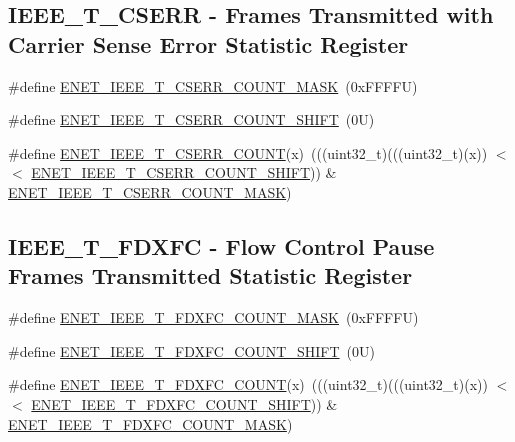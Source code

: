 \subsection*{I\+E\+E\+E\+\_\+\+T\+\_\+\+C\+S\+E\+RR -\/ Frames Transmitted with Carrier Sense Error Statistic Register}
\begin{DoxyCompactItemize}
\item 
\#define \mbox{\hyperlink{group___e_n_e_t___register___masks_gaa0672cfe66f04b84789c73a1eeb66ade}{E\+N\+E\+T\+\_\+\+I\+E\+E\+E\+\_\+\+T\+\_\+\+C\+S\+E\+R\+R\+\_\+\+C\+O\+U\+N\+T\+\_\+\+M\+A\+SK}}~(0x\+F\+F\+F\+F\+U)
\item 
\#define \mbox{\hyperlink{group___e_n_e_t___register___masks_gad924e12885d92c79e4ef3ec41026f929}{E\+N\+E\+T\+\_\+\+I\+E\+E\+E\+\_\+\+T\+\_\+\+C\+S\+E\+R\+R\+\_\+\+C\+O\+U\+N\+T\+\_\+\+S\+H\+I\+FT}}~(0\+U)
\item 
\#define \mbox{\hyperlink{group___e_n_e_t___register___masks_gaecf8a547340b8a07699467f79f3989fc}{E\+N\+E\+T\+\_\+\+I\+E\+E\+E\+\_\+\+T\+\_\+\+C\+S\+E\+R\+R\+\_\+\+C\+O\+U\+NT}}(x)~(((uint32\+\_\+t)(((uint32\+\_\+t)(x)) $<$$<$ \mbox{\hyperlink{group___e_n_e_t___register___masks_gad924e12885d92c79e4ef3ec41026f929}{E\+N\+E\+T\+\_\+\+I\+E\+E\+E\+\_\+\+T\+\_\+\+C\+S\+E\+R\+R\+\_\+\+C\+O\+U\+N\+T\+\_\+\+S\+H\+I\+FT}})) \& \mbox{\hyperlink{group___e_n_e_t___register___masks_gaa0672cfe66f04b84789c73a1eeb66ade}{E\+N\+E\+T\+\_\+\+I\+E\+E\+E\+\_\+\+T\+\_\+\+C\+S\+E\+R\+R\+\_\+\+C\+O\+U\+N\+T\+\_\+\+M\+A\+SK}})
\end{DoxyCompactItemize}
\subsection*{I\+E\+E\+E\+\_\+\+T\+\_\+\+F\+D\+X\+FC -\/ Flow Control Pause Frames Transmitted Statistic Register}
\begin{DoxyCompactItemize}
\item 
\#define \mbox{\hyperlink{group___e_n_e_t___register___masks_gab017cc2737c10a8709398a3a47dc3ade}{E\+N\+E\+T\+\_\+\+I\+E\+E\+E\+\_\+\+T\+\_\+\+F\+D\+X\+F\+C\+\_\+\+C\+O\+U\+N\+T\+\_\+\+M\+A\+SK}}~(0x\+F\+F\+F\+F\+U)
\item 
\#define \mbox{\hyperlink{group___e_n_e_t___register___masks_ga122b6e4e5176d31a1f66b7f04c18826f}{E\+N\+E\+T\+\_\+\+I\+E\+E\+E\+\_\+\+T\+\_\+\+F\+D\+X\+F\+C\+\_\+\+C\+O\+U\+N\+T\+\_\+\+S\+H\+I\+FT}}~(0\+U)
\item 
\#define \mbox{\hyperlink{group___e_n_e_t___register___masks_ga8c8fc6886dc17857025cdbc8da521a39}{E\+N\+E\+T\+\_\+\+I\+E\+E\+E\+\_\+\+T\+\_\+\+F\+D\+X\+F\+C\+\_\+\+C\+O\+U\+NT}}(x)~(((uint32\+\_\+t)(((uint32\+\_\+t)(x)) $<$$<$ \mbox{\hyperlink{group___e_n_e_t___register___masks_ga122b6e4e5176d31a1f66b7f04c18826f}{E\+N\+E\+T\+\_\+\+I\+E\+E\+E\+\_\+\+T\+\_\+\+F\+D\+X\+F\+C\+\_\+\+C\+O\+U\+N\+T\+\_\+\+S\+H\+I\+FT}})) \& \mbox{\hyperlink{group___e_n_e_t___register___masks_gab017cc2737c10a8709398a3a47dc3ade}{E\+N\+E\+T\+\_\+\+I\+E\+E\+E\+\_\+\+T\+\_\+\+F\+D\+X\+F\+C\+\_\+\+C\+O\+U\+N\+T\+\_\+\+M\+A\+SK}})
\end{DoxyCompactItemize}
